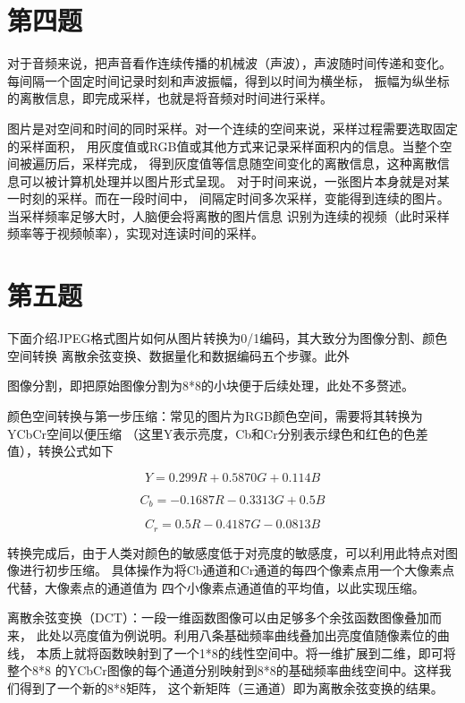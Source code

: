 \documentclass[UTF8]{ctexart}
\begin{document}
\section{第四题}
对于音频来说，把声音看作连续传播的机械波（声波），声波随时间传递和变化。
每间隔一个固定时间记录时刻和声波振幅，得到以时间为横坐标，
振幅为纵坐标的离散信息，即完成采样，也就是将音频对时间进行采样。

图片是对空间和时间的同时采样。对一个连续的空间来说，采样过程需要选取固定的采样面积，
用灰度值或RGB值或其他方式来记录采样面积内的信息。当整个空间被遍历后，采样完成，
得到灰度值等信息随空间变化的离散信息，这种离散信息可以被计算机处理并以图片形式呈现。
对于时间来说，一张图片本身就是对某一时刻的采样。而在一段时间中，
间隔定时间多次采样，变能得到连续的图片。当采样频率足够大时，人脑便会将离散的图片信息
识别为连续的视频（此时采样频率等于视频帧率），实现对连读时间的采样。

\section{第五题}
下面介绍JPEG格式图片如何从图片转换为0/1编码，其大致分为图像分割、颜色空间转换
离散余弦变换、数据量化和数据编码五个步骤。此外

图像分割，即把原始图像分割为8*8的小块便于后续处理，此处不多赘述。

颜色空间转换与第一步压缩：常见的图片为RGB颜色空间，需要将其转换为YCbCr空间以便压缩
（这里Y表示亮度，Cb和Cr分别表示绿色和红色的色差值），转换公式如下
\begin{center}

    \begin{equation}
        Y=0.299R+0.5870G+0.114B
    \end{equation}

    \begin{equation}
        C_{b}=-0.1687R-0.3313G+0.5B
    \end{equation}

    \begin{equation}
        C_{r}=0.5R-0.4187G-0.0813B
    \end{equation}

\end{center}
转换完成后，由于人类对颜色的敏感度低于对亮度的敏感度，可以利用此特点对图像进行初步压缩。
具体操作为将Cb通道和Cr通道的每四个像素点用一个大像素点代替，大像素点的通道值为
四个小像素点通道值的平均值，以此实现压缩。

离散余弦变换（DCT）：一段一维函数图像可以由足够多个余弦函数图像叠加而来，
此处以亮度值为例说明。利用八条基础频率曲线叠加出亮度值随像素位的曲线，
本质上就将函数映射到了一个1*8的线性空间中。将一维扩展到二维，即可将整个8*8
的YCbCr图像的每个通道分别映射到8*8的基础频率曲线空间中。这样我们得到了一个新的8*8矩阵，
这个新矩阵（三通道）即为离散余弦变换的结果。
\end{document}
